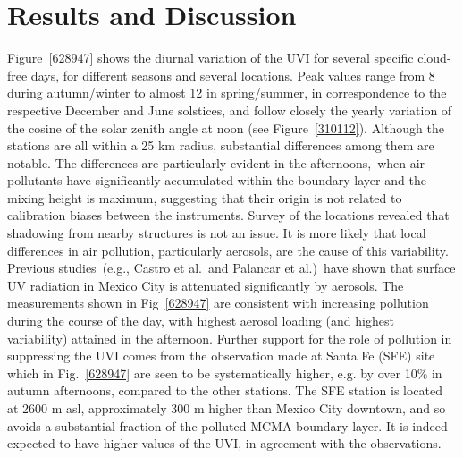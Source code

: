 \documentclass[10pt]{article}
\begin{document}
\section*{Results and Discussion}

 {\label{447962}}

Figure~{\ref{628947}} shows the diurnal variation of
the UVI for several specific cloud-free days, for different seasons and
several locations. Peak values range from 8 during autumn/winter to
almost 12 in spring/summer, in correspondence to the respective December
and June solstices, and follow closely the yearly variation of the
cosine of the solar zenith angle at noon (see
Figure~{\ref{310112}}). Although the stations are all
within a 25 km radius, substantial differences among them are notable.
The differences are particularly evident in the afternoons,~when air
pollutants have significantly accumulated within the boundary layer and
the mixing height is maximum, suggesting that their origin is not
related to calibration biases between the instruments. Survey of the
locations revealed that shadowing from nearby structures is not an
issue. It is more likely that local differences in air pollution,
particularly aerosols, are the cause of this variability. Previous
studies~(e.g., Castro et al.\cite{Castro_2001}~and Palancar et
al.\cite{Palancar_2013})~have shown that surface UV radiation in Mexico
City is attenuated significantly by aerosols. The measurements shown in
Fig~{\ref{628947}} are consistent with increasing
pollution during the course of the day, with highest aerosol loading
(and highest variability) attained in the afternoon. Further support for
the role of pollution in suppressing the UVI comes from the observation
made at Santa Fe (SFE) site which in
Fig.~{\ref{628947}} are seen to be systematically
higher, e.g. by over 10\% in autumn afternoons, compared to the other
stations. The SFE station is located at 2600 m asl, approximately 300 m
higher than Mexico City downtown, and so avoids a substantial fraction
of the polluted MCMA boundary layer.\cite{SEDEMA2018a} It is indeed
expected to have higher values of the UVI, in agreement with the
observations.
\end{document}
